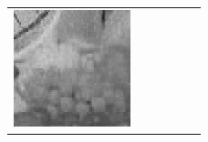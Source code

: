 \documentclass[11pt,a4paper,openright,oneside]{book}
\numberwithin{equation}{section}
\begin{document}
{\begin{figure}[h]
\begin{adjustwidth}{-3cm}{-3cm}
\begin{tabular}{>{\centering\arraybackslash}m{1.5cm} m{2.5cm} m{2.5cm} m{2.5cm} m{2.5cm} m{2.5cm}}
        \includegraphics[width=\linewidth]{media/tnale/AAAfruits-comp5-ale-4.png} \\
        

\end{tabular}
\end{adjustwidth}
\end{figure}}
\end{document}
